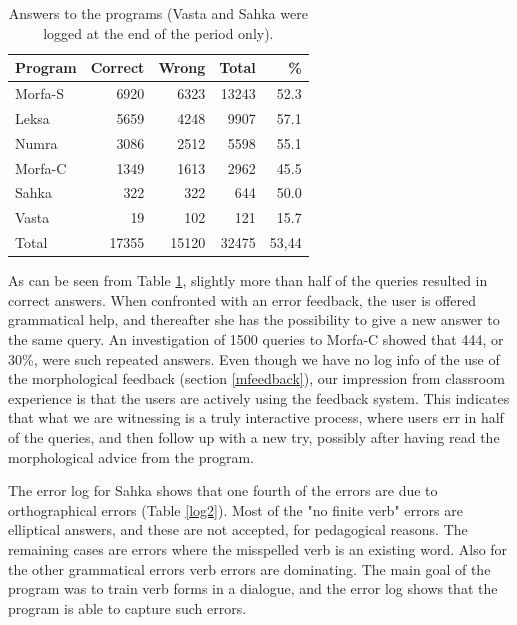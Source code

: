 \documentclass[11pt]{article}
\begin{document}
\begin{table}[htdp]
\caption{Answers to the programs (Vasta and Sahka were logged at the end of the period only).}
\begin{center}
\begin{tabular}{|l|r|r|r|r|}
\hline
Program     & Correct &   Wrong &    Total &  \% \\
\hline									 
Morfa-S  &  6920   & 6323    & 13243    & 52.3 \\
Leksa    &  5659   & 4248    & 9907	    & 57.1  \\
Numra    &  3086   & 2512    & 5598	    & 55.1  \\
Morfa-C  &  1349   & 1613    & 2962	    & 45.5  \\
Sahka    &   322   &   322   &  644	    & 50.0  \\
Vasta    &   19    &   102   &  121	    & 15.7 \\
\hline
Total   & 17355  &  15120  &  32475  &  53,44\\
\hline
\end{tabular}
\end{center}
\label{log1}
\end{table}


As can be seen from Table \ref{log1}, slightly more than half of the queries resulted in correct answers. When confronted with an error feedback, the user is offered grammatical help, and thereafter she has the possibility to give a new answer to the same query. An investigation of 1500 queries to Morfa-C showed that 444, or 30\%, were such repeated answers. Even though we have no log info of the use of the morphological feedback (section \ref{mfeedback}), our impression from classroom experience is that the users are actively using the feedback system. This indicates that what we are witnessing is a truly interactive process, where users err in half of the queries, and then follow up with a new try, possibly after having read the morphological advice from the program.

The error log for Sahka shows that one fourth of the errors are due to orthographical errors (Table \ref{log2}). Most of the "no finite verb" errors are elliptical answers, and these are not accepted, for pedagogical reasons. The remaining cases are errors where the misspelled verb is an existing word. Also for the other grammatical errors verb errors are dominating. The main goal of the program was to train verb forms in a dialogue, and the error log shows that the program is able to capture such errors.
\end{document}
